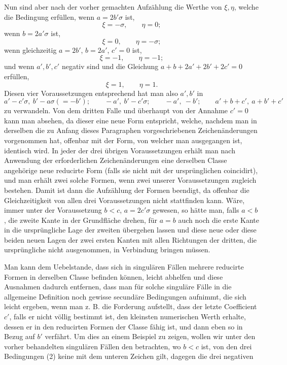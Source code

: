 \documentclass[11pt]{article}
\begin{document}
Nun sind aber nach der vorher gemachten Aufzählung die Werthe von $\xi,\eta$, welche die Bedingung erfüllen, wenn $a=2b'\sigma$ ist,
\[
 \xi=-\sigma,
 \qquad \eta=0;
\]
wenn $b=2a'\sigma$ ist,
\[
 \xi=0,
 \qquad \eta=-\sigma;
\]
wenn gleichzeitig $a=2b'$, $b=2a'$, $c'=0$ ist,
\[
 \xi=-1,
 \qquad \eta=-1;
\]
und wenn $a',b',c'$ negativ sind und die Gleichung $a+b+2a'+2b'+2c'=0$ erfüllen,
\[
 \xi=1,
 \qquad \eta=1.
\]
Diesen vier Voraussetzungen entsprechend hat man also $a',b'$ in
\[
 a'-c'\sigma,\ b'-a\sigma(=-b');
 \qquad -a',\ b'-c'\sigma;
 \qquad -a',\ -b';
 \qquad a'+b+c',\ a+b'+c'
\]
zu verwandeln. Von dem dritten Falle und überhaupt von der Annahme $c'=0$ kann man absehen, da dieser eine neue Form entspricht, welche, nachdem man in derselben die zu Anfang dieses Paragraphen vorgeschriebenen Zeichenänderungen vorgenommen hat, offenbar mit der Form, von welcher man ausgegangen ist, identisch wird. In jeder der drei übrigen Voraussetzungen erhält man nach Anwendung der erforderlichen Zeichenänderungen eine derselben Classe angehörige neue reducirte Form (falls sie nicht mit der ursprünglichen coincidirt), und man erhält zwei solche Formen, wenn zwei unserer Voraussetzungen zugleich bestehen. Damit ist dann die Aufzählung der Formen beendigt, da offenbar die Gleichzeitigkeit von allen drei Voraussetzungen nicht stattfinden kann. Wäre, immer unter der Voraussetzung $b<c$, $a=2c'\sigma$ gewesen, so hätte man, falls $a<b$, die zweite Kante in der Grundfläche drehen, für $a=b$ auch noch die erste Kante in die ursprüngliche Lage der zweiten übergehen lassen und diese neue oder diese beiden neuen Lagen der zwei ersten Kanten mit allen Richtungen der dritten, die ursprüngliche nicht ausgenommen, in Verbindung bringen müssen.

Man kann dem Uebelstande, dass sich in singulären Fällen mehrere reducirte Formen in derselben Classe befinden können, leicht abhelfen und diese Ausnahmen dadurch entfernen, dass man für solche singuläre Fälle in die allgemeine Definition noch gewisse secundäre Bedingungen aufnimmt, die sich leicht ergeben, wenn man z. B. die Forderung aufstellt, dass der letzte Coefficient $c'$, falls er nicht völlig bestimmt ist, den kleinsten numerischen Werth erhalte, dessen er in den reducirten Formen der Classe fähig ist, und dann eben so in Bezug auf $b'$ verfährt. Um dies an einem Beispiel zu zeigen, wollen wir unter den vorher behandelten singulären Fällen den betrachten, wo $b<c$ ist, von den drei Bedingungen (2) keine mit dem unteren Zeichen gilt, dagegen die drei negativen
\end{document}
